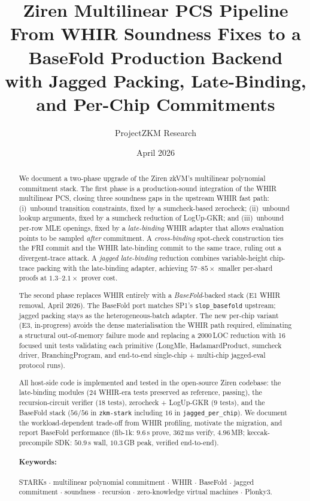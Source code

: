 \documentclass[11pt,a4paper]{article}
\title{\Large\textbf{Ziren Multilinear PCS Pipeline}\\[0.3em]
  \large From WHIR Soundness Fixes to a BaseFold Production Backend%
  \\[0.5em]
  \normalsize with Jagged Packing, Late-Binding, and Per-Chip Commitments}
\author[1]{ProjectZKM Research}
\affil[1]{ProjectZKM}
\date{April 2026}
\theoremstyle{definition}
\theoremstyle{remark}
\begin{document}
\maketitle

\begin{abstract}
\noindent
We document a two-phase upgrade of the Ziren zkVM's multilinear
polynomial commitment stack.  The first phase is a production-sound
integration of the WHIR multilinear PCS, closing three soundness
gaps in the upstream WHIR fast path: (i)~unbound transition
constraints, fixed by a sumcheck-based zerocheck; (ii)~unbound
lookup arguments, fixed by a sumcheck reduction of LogUp-GKR; and
(iii)~unbound per-row MLE openings, fixed by a \emph{late-binding}
WHIR adapter that allows evaluation points to be sampled
\emph{after} commitment.  A \emph{cross-binding} spot-check
construction ties the FRI commit and the WHIR late-binding commit
to the same trace, ruling out a divergent-trace attack.  A
\emph{jagged late-binding} reduction combines variable-height
chip-trace packing with the late-binding adapter, achieving
$57$--$85\times$ smaller per-shard proofs at $1.3$--$2.1\times$
prover cost.

The second phase replaces WHIR entirely with a
\emph{BaseFold}-backed stack (E1 WHIR removal, April 2026).  The
BaseFold port matches SP1's \texttt{slop\_basefold} upstream;
jagged packing stays as the heterogeneous-batch adapter.  The new
per-chip variant (E3, in-progress) avoids the dense materialisation
the WHIR path required, eliminating a structural out-of-memory
failure mode and replacing a 2000\,LOC reduction with 16 focused
unit tests validating each primitive (LongMle, HadamardProduct,
sumcheck driver, BranchingProgram, and end-to-end single-chip +
multi-chip jagged-eval protocol runs).

All host-side code is implemented and tested in the open-source
Ziren codebase: the late-binding modules ($24$ WHIR-era tests
preserved as reference, passing), the recursion-circuit verifier
($18$ tests), zerocheck + LogUp-GKR ($9$ tests), and the BaseFold
stack ($56/56$ in \texttt{zkm-stark} including $16$ in
\texttt{jagged\_per\_chip}).  We document the workload-dependent
trade-off from WHIR profiling, motivate the migration, and report
BaseFold performance (fib-1k: $9.6$\,s prove, $362$\,ms verify,
$4.96$\,MB; keccak-precompile SDK: $50.9$\,s wall, $10.3$\,GB peak,
verified end-to-end).

\paragraph{Keywords:}
STARKs $\cdot$ multilinear polynomial commitment $\cdot$ WHIR
$\cdot$ BaseFold $\cdot$ jagged commitment $\cdot$ soundness $\cdot$
recursion $\cdot$ zero-knowledge virtual machines $\cdot$ Plonky3.
\end{abstract}
\end{document}
